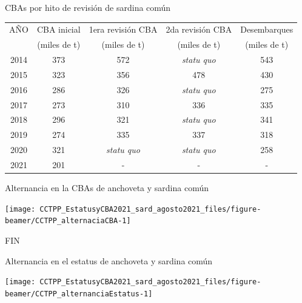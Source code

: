 \documentclass[
  ignorenonframetext,
]{beamer}
\begin{document}
\begin{frame}{CBAs por hito de revisión de sardina común}
\protect\hypertarget{cbas-por-hito-de-revisiuxf3n-de-sardina-comuxfan}{}
\begin{table}[h]
    \centering
    \resizebox{8cm}{!} {
    \begin{tabular}{|c|c|c|c|c|}
    \hline
AÑO  & CBA inicial  & 1era revisión CBA  & 2da revisión CBA     & Desembarques  \\ 
     & (miles de t) & (miles de t)       & (miles de t)         & (miles de t)   \\ \hline
2014 & 373          & 572                & \textit{statu quo}   & 543 \\
2015 & 323          & 356                & 478                  & 430 \\
2016 & 286          & 326                & \textit{statu quo}   & 275 \\
2017 & 273          & 310                & 336                  & 335 \\
2018 & 296          & 321                & \textit{statu quo}   & 341 \\
2019 & 274          & 335                & 337                  & 318 \\
2020 & 321          & \textit{statu quo} & \textit{statu quo}   & 258   \\ 
2021 & 201          & -                  & -                    &- \\\hline
  \end{tabular}}
        \end{table}
\end{frame}

\begin{frame}{Alternancia en la CBAs de anchoveta y sardina común}
\protect\hypertarget{alternancia-en-la-cbas-de-anchoveta-y-sardina-comuxfan}{}
\begin{center}\texttt{[image: CCTPP\_EstatusyCBA2021\_sard\_agosto2021\_files/figure-beamer/CCTPP\_alternaciaCBA-1]} \end{center}
\end{frame}

\begin{frame}{}
\protect\hypertarget{section}{}
FIN
\end{frame}

\begin{frame}{Alternancia en el estatus de anchoveta y sardina común}
\protect\hypertarget{alternancia-en-el-estatus-de-anchoveta-y-sardina-comuxfan}{}
\begin{center}\texttt{[image: CCTPP\_EstatusyCBA2021\_sard\_agosto2021\_files/figure-beamer/CCTPP\_alternanciaEstatus-1]} \end{center}
\end{frame}
\end{document}

